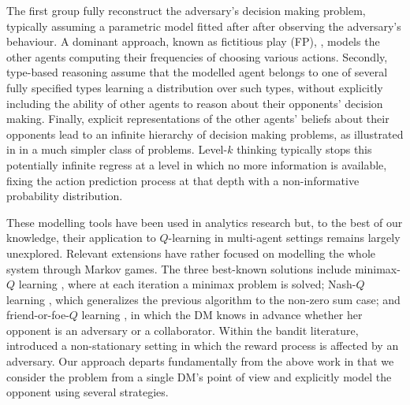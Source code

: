 The first group fully reconstruct the adversary's decision
making problem, typically assuming a parametric model fitted after 
after observing the adversary's behaviour. A dominant approach,
known as fictitious play  (FP), \parencite{brown1951iterative}, models 
the other agents computing their frequencies of choosing various actions.
Secondly, %
type-based reasoning assume that the modelled agent belongs
to one of several fully specified types learning 
a distribution over such types, %
without explicitly including the ability of
other agents to reason about their opponents' decision making. 
Finally, explicit representations of the other agents' beliefs about their
opponents lead to an infinite hierarchy of decision making problems,
as illustrated in \parencite{rios2012adversarial} in a much simpler class of problems. Level-$k$ thinking  \parencite{stahl1994experimental} typically stops this potentially infinite regress at a level in which no more information is available, fixing the action prediction process at that depth with a non-informative probability distribution.

These modelling tools have been used in analytics 
research but, to the best
of our knowledge, their application to $Q$-learning in multi-agent settings remains 
largely unexplored. Relevant extensions %
have rather focused on modelling the whole system 
through Markov games. The three best-known solutions include minimax-$Q$ learning \parencite{littman1994markov}, where at each iteration a minimax 
problem is solved; Nash-$Q$ learning \parencite{hu2003nash}, 
which generalizes the previous algorithm to the non-zero sum case;
and friend-or-foe-$Q$ learning \parencite{littman2001friend}, in which the DM knows in advance whether her opponent is an adversary or a collaborator. Within the bandit literature, \parencite{auer1995gambling} introduced a non-stationary setting in which the reward process is affected by an adversary. Our approach departs fundamentally from the above
work in that we consider the problem from a single DM's point of view and 
explicitly model the opponent using several strategies.

